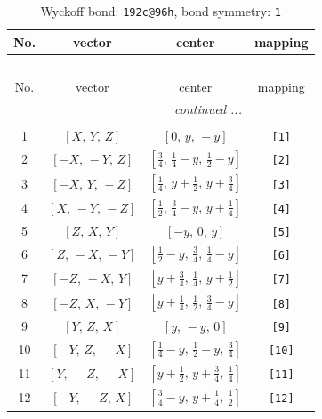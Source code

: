 \documentclass[fleqn,8pt]{jsarticle}
\begin{document}
\begin{longtable}{cccc}
\caption{Wyckoff bond: {\tt 192c@96h}, bond symmetry: {\tt 1}}
 \\
 \hline \hline
No. & vector & center & mapping \\ \hline \endfirsthead

\multicolumn{3}{l}{\tablename\ \thetable{}} \\
 \hline \hline
No. & vector & center & mapping \\ \hline \endhead

 \hline \hline
\multicolumn{3}{r}{\footnotesize\it continued ...} \\ \endfoot

 \hline \hline
\multicolumn{3}{r}{} \\ \endlastfoot

1 & $\left[ X,\, Y,\, Z \right]$ & $\left[ 0,\, y,\, - y \right]$ & {\tt [1]} \\ \hline
2 & $\left[ - X,\, - Y,\, Z \right]$ & $\left[ \frac{3}{4},\, \frac{1}{4} - y,\, \frac{1}{2} - y \right]$ & {\tt [2]} \\ \hline
3 & $\left[ - X,\, Y,\, - Z \right]$ & $\left[ \frac{1}{4},\, y + \frac{1}{2},\, y + \frac{3}{4} \right]$ & {\tt [3]} \\ \hline
4 & $\left[ X,\, - Y,\, - Z \right]$ & $\left[ \frac{1}{2},\, \frac{3}{4} - y,\, y + \frac{1}{4} \right]$ & {\tt [4]} \\ \hline
5 & $\left[ Z,\, X,\, Y \right]$ & $\left[ - y,\, 0,\, y \right]$ & {\tt [5]} \\ \hline
6 & $\left[ Z,\, - X,\, - Y \right]$ & $\left[ \frac{1}{2} - y,\, \frac{3}{4},\, \frac{1}{4} - y \right]$ & {\tt [6]} \\ \hline
7 & $\left[ - Z,\, - X,\, Y \right]$ & $\left[ y + \frac{3}{4},\, \frac{1}{4},\, y + \frac{1}{2} \right]$ & {\tt [7]} \\ \hline
8 & $\left[ - Z,\, X,\, - Y \right]$ & $\left[ y + \frac{1}{4},\, \frac{1}{2},\, \frac{3}{4} - y \right]$ & {\tt [8]} \\ \hline
9 & $\left[ Y,\, Z,\, X \right]$ & $\left[ y,\, - y,\, 0 \right]$ & {\tt [9]} \\ \hline
10 & $\left[ - Y,\, Z,\, - X \right]$ & $\left[ \frac{1}{4} - y,\, \frac{1}{2} - y,\, \frac{3}{4} \right]$ & {\tt [10]} \\ \hline
11 & $\left[ Y,\, - Z,\, - X \right]$ & $\left[ y + \frac{1}{2},\, y + \frac{3}{4},\, \frac{1}{4} \right]$ & {\tt [11]} \\ \hline
12 & $\left[ - Y,\, - Z,\, X \right]$ & $\left[ \frac{3}{4} - y,\, y + \frac{1}{4},\, \frac{1}{2} \right]$ & {\tt [12]} \\ \hline

\end{longtable}
\end{document}
